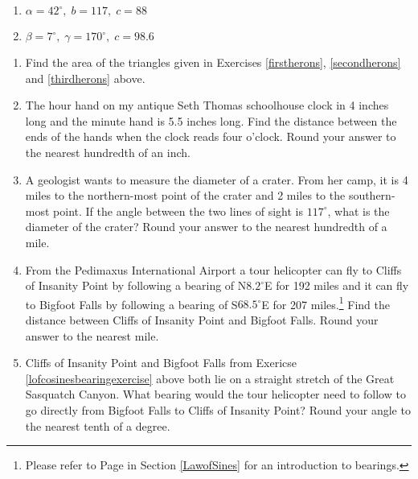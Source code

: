 \begin{multicols}{2} 

\begin{enumerate}

\setcounter{enumi}{\value{HW}}

\item $\alpha = 42^{\circ}, \; b = 117, \; c = 88$
\item $\beta = 7^{\circ}, \; \gamma = 170^{\circ}, \; c = 98.6$ \label{anylawlast}

\setcounter{HW}{\value{enumi}}

\end{enumerate}

\end{multicols}

\begin{enumerate}

\setcounter{enumi}{\value{HW}}

\item Find the area of the triangles given in Exercises \ref{firstherons}, \ref{secondherons} and \ref{thirdherons} above.

\item The hour hand on my antique Seth Thomas schoolhouse clock in 4 inches long and the minute hand is 5.5 inches long.  Find the distance between the ends of the hands when the clock reads four o'clock.  Round your answer to the nearest hundredth of an inch.

\item A geologist wants to measure the diameter of a crater.   From her camp, it is 4 miles to the northern-most point of the crater and 2 miles to the southern-most point.  If the angle between the two lines of sight is $117^{\circ}$, what is the diameter of the crater?  Round your answer to the nearest hundredth of a mile.

\item From the Pedimaxus International Airport a tour helicopter can fly to Cliffs of Insanity Point by following a bearing of N$8.2^{\circ}$E for 192 miles and it can fly to Bigfoot Falls by following a bearing of S$68.5^{\circ}$E for 207 miles.\footnote{Please refer to Page \pageref{bearings} in Section \ref{LawofSines} for an introduction to bearings.}  Find the distance between Cliffs of Insanity Point and Bigfoot Falls.  Round your answer to the nearest mile.  \label{lofcosinesbearingexercise}

\item Cliffs of Insanity Point and Bigfoot Falls from Exericse \ref{lofcosinesbearingexercise} above both lie on a straight stretch of the Great Sasquatch Canyon.  What bearing would the tour helicopter need to follow to go directly from Bigfoot Falls to Cliffs of Insanity Point?  Round your angle to the nearest tenth of a degree.


\end{enumerate}
